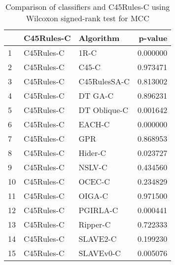 \begin{table}
\footnotesize
\caption{Comparison of classifiers and C45Rules-C using Wilcoxon signed-rank test for MCC}
\label{tab:C45Rules-C wilcoxon MCC comparison}
\begin{tabular}{lllr}
\hline
 & C45Rules-C & Algorithm & p-value \\
\hline
1 & C45Rules-C & 1R-C & 0.000000 \\
2 & C45Rules-C & C45-C & 0.973471 \\
3 & C45Rules-C & C45RulesSA-C & 0.813002 \\
4 & C45Rules-C & DT GA-C & 0.896231 \\
5 & C45Rules-C & DT Oblique-C & 0.001642 \\
6 & C45Rules-C & EACH-C & 0.000000 \\
7 & C45Rules-C & GPR & 0.868953 \\
8 & C45Rules-C & Hider-C & 0.023727 \\
9 & C45Rules-C & NSLV-C & 0.434560 \\
10 & C45Rules-C & OCEC-C & 0.234829 \\
11 & C45Rules-C & OIGA-C & 0.971500 \\
12 & C45Rules-C & PGIRLA-C & 0.000441 \\
13 & C45Rules-C & Ripper-C & 0.722333 \\
14 & C45Rules-C & SLAVE2-C & 0.199230 \\
15 & C45Rules-C & SLAVEv0-C & 0.005076 \\
\hline
\end{tabular}
\end{table}
